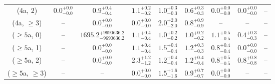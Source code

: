\begin{table}[h!]
{\begin{tabular}{ccccccccc}
	(4a, 2) & $0.0^{+ 0.0 }_{- 0.0 }$ & $0.9^{+ 0.4 }_{- 0.4 }$ & $1.1^{+ 0.2 }_{- 0.2 }$ & $1.0^{+ 0.3 }_{- 0.3 }$ & $0.6^{+ 0.3 }_{- 0.3 }$ & $0.0^{+ 0.0 }_{- 0.0 }$ & $0.0^{+ 0.0 }_{- 0.0 }$ & -- \\[0.5ex] 
	(4a, $\ge3$) & -- & $0.0^{+ 0.0 }_{- 0.0 }$ & $0.0^{+ 0.0 }_{- 0.0 }$ & $2.0^{+ 2.0 }_{- 2.0 }$ & $0.8^{+ 0.9 }_{- 0.9 }$ & -- & -- & -- \\[0.5ex] 
	($\ge5$a, 0) & -- & $1695.2^{+ 9690636.2 }_{- 9690636.2 }$ & $1.1^{+ 0.4 }_{- 0.4 }$ & $1.0^{+ 0.2 }_{- 0.2 }$ & $1.0^{+ 0.2 }_{- 0.2 }$ & $1.1^{+ 0.5 }_{- 0.5 }$ & $0.4^{+ 0.3 }_{- 0.3 }$ & -- \\[0.5ex] 
	($\ge5$a, 1) & -- & $0.0^{+ 0.0 }_{- 0.0 }$ & $1.1^{+ 0.4 }_{- 0.4 }$ & $1.5^{+ 0.4 }_{- 0.4 }$ & $1.2^{+ 0.3 }_{- 0.3 }$ & $0.8^{+ 0.4 }_{- 0.4 }$ & $0.0^{+ 0.0 }_{- 0.0 }$ & -- \\[0.5ex] 
	($\ge5$a, 2) & -- & $0.0^{+ 0.0 }_{- 0.0 }$ & $2.3^{+ 1.2 }_{- 1.2 }$ & $1.2^{+ 0.4 }_{- 0.4 }$ & $1.2^{+ 0.4 }_{- 0.4 }$ & $0.8^{+ 0.5 }_{- 0.5 }$ & $0.8^{+ 0.8 }_{- 0.8 }$ & -- \\[0.5ex] 
	($\ge5$a, $\ge3$) & -- & -- & $0.0^{+ 0.0 }_{- 0.0 }$ & $1.5^{+ 1.6 }_{- 1.6 }$ & $0.9^{+ 0.7 }_{- 0.7 }$ & $0.0^{+ 0.0 }_{- 0.0 }$ & -- & -- \\[0.5ex] 
	\hline
	\hline
\end{tabular}}
\end{table}
